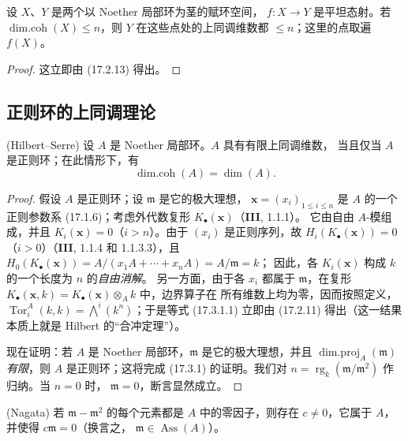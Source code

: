 \begin{proposition}[17.2.15]
\label{0.17.2.15-fr}
设 $X$、$Y$ 是两个以 Noether 局部环为茎的赋环空间，
$f:X\longrightarrow Y$ 是平坦态射。若
$\operatorname{dim.coh}(X)\leq n$，则 $Y$ 在这些点处的上同调维数都
$\leq n$；这里的点取遍 $f(X)$。
\end{proposition}

\begin{proof}
这立即由 (17.2.13) 得出。
\end{proof}

\subsection{正则环的上同调理论}
\label{subsection:0.17.3-fr}

\begin{theorem}[17.3.1]
\label{0.17.3.1-fr}
\textnormal{(Hilbert--Serre)} 设 $A$ 是 Noether 局部环。$A$ 具有有限上同调维数，
当且仅当 $A$ 是正则环；在此情形下，有
\begin{equation}
\label{0.17.3.1.1-fr}
\tag{17.3.1.1}
  \operatorname{dim.coh}(A)=\dim(A).
\end{equation}
\end{theorem}

\begin{proof}
假设 $A$ 是正则环；设 $\mathfrak{m}$ 是它的极大理想，
$\mathbf{x}=(x_i)_{1\leq i\leq n}$ 是 $A$ 的一个正则参数系
(17.1.6)；考虑外代数复形 $K_\bullet(\mathbf{x})$（\textbf{III}, 1.1.1）。
它由自由 $A$-模组成，并且 $K_i(\mathbf{x})=0$（$i>n$）。由于
$(x_i)$ 是正则序列，故
$H_i(K_\bullet(\mathbf{x}))=0$（$i>0$）（\textbf{III}, 1.1.4 和 1.1.3.3），且
$H_0(K_\bullet(\mathbf{x}))=A/(x_1A+\cdots+x_nA)=A/\mathfrak{m}=k$；
因此，各 $K_i(\mathbf{x})$ 构成 $k$ 的一个长度为 $n$ 的\emph{自由消解}。
另一方面，由于各 $x_i$ 都属于 $\mathfrak{m}$，在复形
$K_\bullet(\mathbf{x},k)=K_\bullet(\mathbf{x})\otimes_A k$ 中，边界算子在
所有维数上均为零，因而按照定义，
$\operatorname{Tor}^A_i(k,k)=\bigwedge^i(k^n)$；于是等式 (17.3.1.1)
立即由 (17.2.11) 得出（这一结果本质上就是 Hilbert 的“合冲定理”）。

现在证明：若 $A$ 是 Noether 局部环，$\mathfrak{m}$ 是它的极大理想，并且
$\operatorname{dim.proj}_A(\mathfrak{m})$ \emph{有限}，则 $A$ 是正则环；这将完成
(17.3.1) 的证明。我们对
$n=\operatorname{rg}_k(\mathfrak{m}/\mathfrak{m}^2)$ 作归纳。当 $n=0$ 时，
$\mathfrak{m}=0$，断言显然成立。
\end{proof}

\begin{lemma}[17.3.1.2]
\label{0.17.3.1.2-fr}
\textnormal{(Nagata)} 若 $\mathfrak{m}-\mathfrak{m}^2$ 的每个元素都是 $A$
中的零因子，则存在 $c\neq0$，它属于 $A$，并使得 $c\mathfrak{m}=0$（换言之，
$\mathfrak{m}\in\operatorname{Ass}(A)$）。
\end{lemma}

